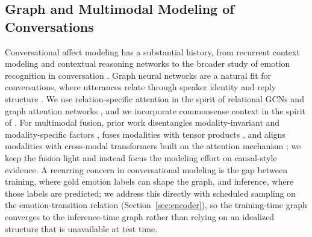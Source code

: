 \documentclass[journal]{IEEEtran}
\begin{document}
\subsection{Graph and Multimodal Modeling of Conversations}
Conversational affect modeling has a substantial history, from recurrent context
modeling \cite{majumder2019dialoguernn} and contextual reasoning networks
\cite{hu2021dialoguecrn} to the broader study of emotion recognition in conversation
\cite{poria2019meld_conv,poria2019meld}. Graph neural networks are a natural fit for
conversations, where utterances relate through speaker identity and reply structure
\cite{ghosal2019dialoguegcn}. We use
relation-specific attention in the spirit of relational GCNs \cite{schlichtkrull2018rgcn}
and graph attention networks \cite{velickovic2018gat}, and we incorporate commonsense
context in the spirit of \cite{ghosal2020cosmic}. For multimodal fusion, prior work
disentangles modality-invariant and modality-specific factors \cite{hazarika2020misa},
fuses modalities with tensor products \cite{zadeh2017tensor}, and aligns modalities with
cross-modal transformers \cite{tsai2019mult} built on the attention mechanism
\cite{vaswani2017attention}; we keep the fusion light and instead focus the modeling effort on causal-style evidence. A
recurring concern in conversational modeling is the gap between training, where gold
emotion labels can shape the graph, and inference, where those labels are predicted; we
address this directly with scheduled sampling on the emotion-transition relation
(Section~\ref{sec:encoder}), so the training-time graph converges to the inference-time
graph rather than relying on an idealized structure that is unavailable at test time.
\end{document}
